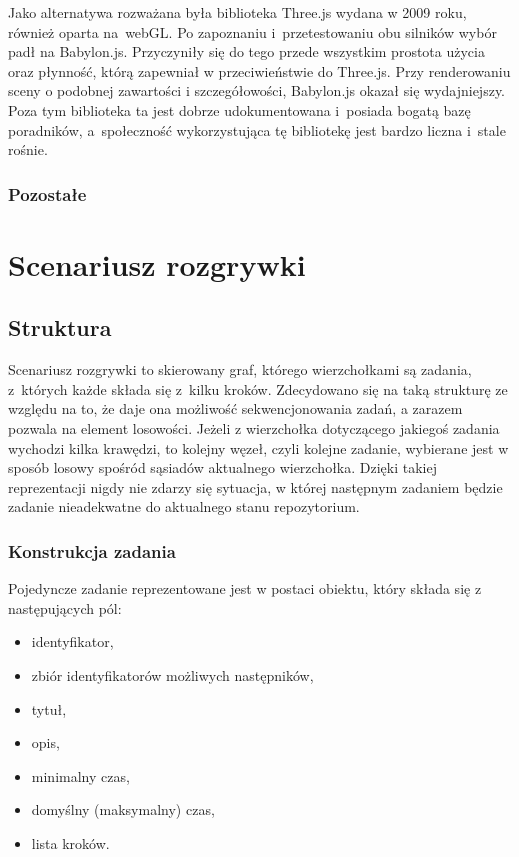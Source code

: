 \documentclass[12pt,a4paper,polish,thesis]{dcsbook}
\begin{document}
{	Jako alternatywa rozważana była biblioteka Three.js wydana w 2009 roku, również oparta na~webGL. Po zapoznaniu i~przetestowaniu obu silników wybór padł na Babylon.js. Przyczyniły się do tego przede wszystkim prostota użycia oraz płynność, którą zapewniał w przeciwieństwie do Three.js. Przy renderowaniu sceny o podobnej zawartości i szczegółowości, Babylon.js okazał się wydajniejszy. Poza tym biblioteka ta jest dobrze udokumentowana i~posiada bogatą bazę poradników, a~społeczność wykorzystująca tę bibliotekę jest bardzo liczna i~stale rośnie.

	\subsubsection{Pozostałe}

	\section{Scenariusz rozgrywki}

	\subsection{Struktura} \label{Struktura}

	Scenariusz rozgrywki to skierowany graf, którego wierzchołkami są zadania, z~których każde składa się z~kilku kroków. Zdecydowano się na taką strukturę ze względu na to, że daje ona możliwość sekwencjonowania zadań, a zarazem pozwala na element losowości. Jeżeli z wierzchołka dotyczącego jakiegoś zadania wychodzi kilka krawędzi, to kolejny węzeł, czyli kolejne zadanie, wybierane jest w sposób losowy spośród sąsiadów aktualnego wierzchołka. Dzięki takiej reprezentacji nigdy nie zdarzy się sytuacja, w której następnym zadaniem będzie zadanie nieadekwatne do aktualnego stanu repozytorium.

	\subsubsection{Konstrukcja zadania}
	Pojedyncze zadanie reprezentowane jest w postaci obiektu, który składa się z następujących pól:
	\begin{itemize}
	\item identyfikator,
	\item zbiór identyfikatorów możliwych następników,
	\item tytuł,
	\item opis,
	\item minimalny czas,
	\item domyślny (maksymalny) czas,
	\item lista kroków.
	\end{itemize}

}
\end{document}
